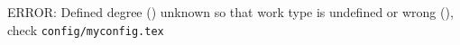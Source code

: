 
{
  
  
}
{
  {
    
    
  }
  {
    {
      
      
    }
    {
      {
        
        
      }
      {
        ERROR: Defined degree (\mydegree) unknown so that work type is
        undefined or wrong (\mybookworktype), check \texttt{config/myconfig.tex}
      }
      
    }

  }

}
